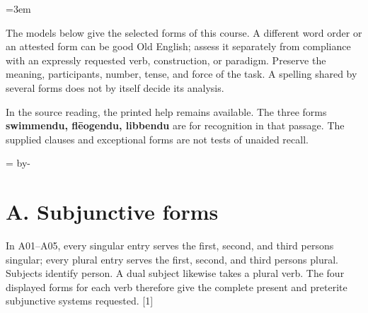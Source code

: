 \newcommand{\runningtitle}{Unit 7. Answer key}

\emergencystretch=3em
\newcommand{\itempara}[2]{\par\addvspace{3pt}\noindent\hangindent=1.8em\hangafter=1\makebox[1.8em][l]{#1.}#2\par}
\newcommand{\reserve}[1]{\par\penalty-100\begingroup\dimen0=\pagegoal\advance\dimen0 by-\pagetotal\ifdim\dimen0<#1\newpage\fi\endgroup}

\raggedright
{}

The models below give the selected forms of this course. A different word order or an attested form can be good Old English; assess it separately from compliance with an expressly requested verb, construction, or paradigm. Preserve the meaning, participants, number, tense, and force of the task. A spelling shared by several forms does not by itself decide its analysis.

In the source reading, the printed help remains available. The three forms \textbf{swimmendu, flēogendu, libbendu} are for recognition in that passage. The supplied clauses and exceptional forms are not tests of unaided recall.

\reserve{7\baselineskip}
\section*{A. Subjunctive forms}

In A01–A05, every singular entry serves the first, second, and third persons singular; every plural entry serves the first, second, and third persons plural. Subjects identify person. A dual subject likewise takes a plural verb. The four displayed forms for each verb therefore give the complete present and preterite subjunctive systems requested. [1]

